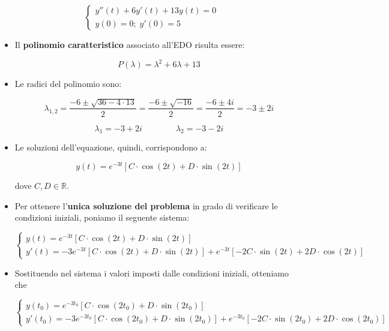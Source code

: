 \documentclass[a4paper, 12pt]{report}
\begin{document}
\begin{itemize}
        $$ 
        \left \{ \begin{array}{l}
            y''(t)+6y'(t)+13y(t)=0 \\
            y(0) = 0; \; y'(0) = 5
        \end{array}\right .
        $$
        
        \begin{itemize}
            \item Il \textbf{polinomio caratteristico} associato all'EDO risulta essere:
            
            \[ P(\lambda) = \lambda^2+6\lambda+13\]
            
            \item Le radici del polinomio sono:
            
            \[ \lambda_{1,2} = \frac{-6 \pm  \sqrt{36-4 \cdot 13}}{2} = \frac{-6 \pm \sqrt{-16}}{2} = \frac{-6 \pm 4i}{2} = -3 \pm 2i\]
            
            \[ \lambda_1 = -3 + 2i \qquad\qquad \lambda_2 = -3 - 2i\]
            
            \item Le soluzioni dell'equazione, quindi, corrispondono a:
            
            \[ y(t) = e^{-3t} [C \cdot \cos(2t) + D \cdot \sin(2t)]\]
            
            dove $C, D \in \mathbb{R}$.
            
            
            \item Per ottenere l'\textbf{unica soluzione del problema} in grado di verificare le condizioni iniziali, poniamo il seguente sistema:
            
            $$ 
            \left \{ \begin{array}{l}
                y(t) = e^{-3t} [C \cdot \cos(2t) + D \cdot \sin(2t)] \\
                y'(t) = -3e^{-3t} [C \cdot \cos(2t) + D \cdot \sin(2t)] + e^{-3t} [-2C \cdot \sin(2t) + 2D \cdot \cos(2t)]
            \end{array}\right .
            $$
            
            \item Sostituendo nel sistema i valori imposti dalle condizioni iniziali, otteniamo che
            
            $$ 
            \left \{ \begin{array}{l}
                y(t_0) = e^{-3t_0} [C \cdot \cos(2t_0) + D \cdot \sin(2t_0)] \\
                y'(t_0) = -3e^{-3t_0} [C \cdot \cos(2t_0) + D \cdot \sin(2t_0)] + e^{-3t_0} [-2C \cdot \sin(2t_0) + 2D \cdot \cos(2t_0)]
            \end{array}\right .
            $$
            

\end{itemize}
\end{itemize}
\end{document}
